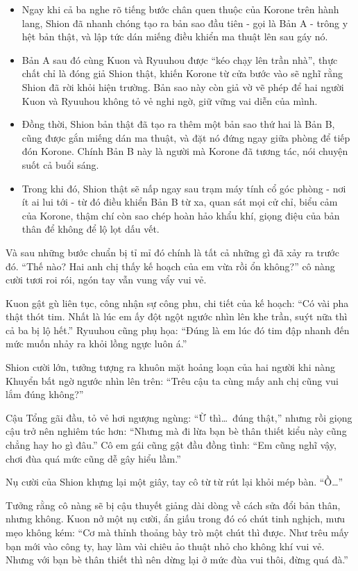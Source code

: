 \documentclass[../main.tex]{subfiles}
\begin{document}
\begin{itemize}
  \item Ngay khi cả ba nghe rõ tiếng bước chân quen thuộc của Korone trên hành lang, Shion đã nhanh chóng tạo ra bản sao đầu tiên - gọi là Bản A - trông y hệt bản thật, và lập tức dán miếng điều khiển ma thuật lên sau gáy nó.
  \item Bản A sau đó cùng Kuon và Ryuuhou được ``kéo chạy lên trần nhà'', thực chất chỉ là đóng giả Shion thật, khiến Korone từ cửa bước vào sẽ nghĩ rằng Shion đã rời khỏi hiện trường. Bản sao này còn giả vờ vẽ phép để hai người Kuon và Ryuuhou không tỏ vẻ nghi ngờ, giữ vững vai diễn của mình.
  \item Đồng thời, Shion bản thật đã tạo ra thêm một bản sao thứ hai là Bản B, cũng được gắn miếng dán ma thuật, và đặt nó đứng ngay giữa phòng để tiếp đón Korone. Chính Bản B này là người mà Korone đã tương tác, nói chuyện suốt cả buổi sáng.
  \item Trong khi đó, Shion thật sẽ nấp ngay sau trạm máy tính cổ góc phòng - nơi ít ai lui tới - từ đó điều khiển Bản B từ xa, quan sát mọi cử chỉ, biểu cảm của Korone, thậm chí còn sao chép hoàn hảo khẩu khí, giọng điệu của bản thân để không để lộ lọt dấu vết.
\end{itemize}

Và sau những bước chuẩn bị tỉ mỉ đó chính là tất cả những gì đã xảy ra trước đó. ``Thế nào? Hai anh chị thấy kế hoạch của em vừa rồi ổn không?'' cô nàng cười tươi roi rói, ngón tay vẫn vung vẩy vui vẻ.

Kuon gật gù liên tục, công nhận sự công phu, chi tiết của kế hoạch: ``Có vài pha thật thót tim. Nhất là lúc em ấy đột ngột ngước nhìn lên khe trần, suýt nữa thì cả ba bị lộ hết.'' Ryuuhou cũng phụ họa: ``Đúng là em lúc đó tim đập nhanh đến mức muốn nhảy ra khỏi lồng ngực luôn á.''

Shion cười lớn, tưởng tượng ra khuôn mặt hoảng loạn của hai người khi nàng Khuyển bất ngờ ngước nhìn lên trên: ``Trêu cậu ta cùng mấy anh chị cũng vui lắm đúng không?''

Cậu Tổng gãi đầu, tỏ vẻ hơi ngượng ngùng: ``Ừ thì\dots\ đúng thật,'' nhưng rồi giọng cậu trở nên nghiêm túc hơn: ``Nhưng mà đi lừa bạn bè thân thiết kiểu này cũng chẳng hay ho gì đâu.'' Cô em gái cũng gật đầu đồng tình: ``Em cũng nghĩ vậy, chơi đùa quá mức cũng dễ gây hiểu lầm.''

Nụ cười của Shion khựng lại một giây, tay cô từ từ rút lại khỏi mép bàn. ``Ồ\dots''

Tưởng rằng cô nàng sẽ bị cậu thuyết giảng dài dòng về cách sửa đổi bản thân, nhưng không. Kuon nở một nụ cười, ẩn giấu trong đó có chút tinh nghịch, mưu mẹo không kém: ``Cơ mà thỉnh thoảng bày trò một chút thì được. Như trêu mấy bạn mới vào công ty, hay làm vài chiêu ảo thuật nhỏ cho không khí vui vẻ. Nhưng với bạn bè thân thiết thì nên dừng lại ở mức đùa vui thôi, đừng quá đà.''
\end{document}
